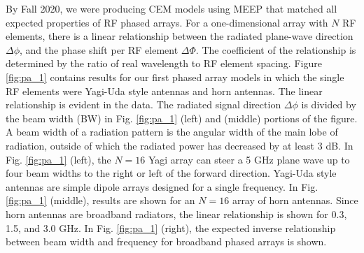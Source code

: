 \documentclass[../../main.tex]{subfiles}
\begin{document}
By Fall 2020, we were producing CEM models using MEEP that matched all expected properties of RF phased arrays.  For a one-dimensional array with $N$ RF elements, there is a linear relationship between the radiated plane-wave direction $\Delta \phi$, and the phase shift per RF element $\Delta \Phi$.  The coefficient of the relationship is determined by the ratio of real wavelength to RF element spacing.  Figure \ref{fig:pa_1} contains results for our first phased array models in which the single RF elements were Yagi-Uda style antennas and horn antennas.  The linear relationship is evident in the data.  The radiated signal direction $\Delta \phi$ is divided by the beam width (BW) in Fig. \ref{fig:pa_1} (left) and (middle) portions of the figure.  A beam width of a radiation pattern is the angular width of the main lobe of radiation, outside of which the radiated power has decreased by at least 3 dB.  In Fig. \ref{fig:pa_1} (left), the $N=16$ Yagi array can steer a 5 GHz plane wave up to four beam widths to the right or left of the forward direction.  Yagi-Uda style antennas are simple dipole arrays designed for a single frequency.  In Fig. \ref{fig:pa_1} (middle), results are shown for an $N=16$ array of horn antennas.  Since horn antennas are broadband radiators, the linear relationship is shown for 0.3, 1.5, and 3.0 GHz.  In Fig. \ref{fig:pa_1} (right), the expected inverse relationship between beam width and frequency for broadband phased arrays is shown. \\ \vspace{2.5mm}
\end{document}
